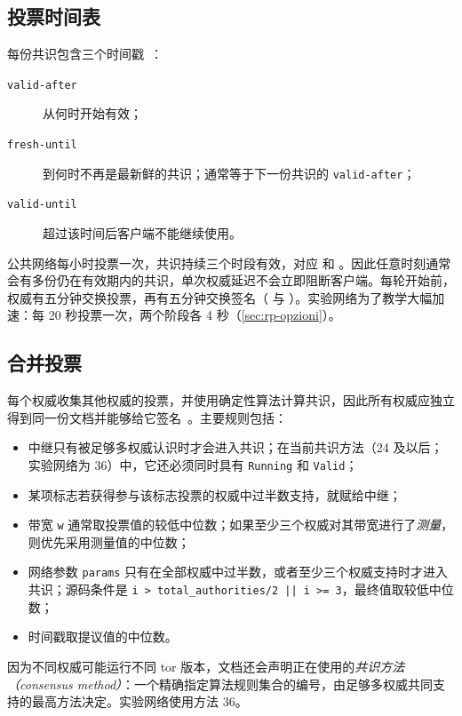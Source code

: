\subsection{投票时间表}

每份共识包含三个时间戳~：
\begin{description}
  \item[\texttt{valid-after}] 从何时开始有效；
  \item[\texttt{fresh-until}] 到何时不再是最新鲜的共识；通常等于下一份共识的 \texttt{valid-after}；
  \item[\texttt{valid-until}] 超过该时间后客户端不能继续使用。
\end{description}

公共网络每小时投票一次，共识持续三个时段有效，对应  和 。因此任意时刻通常会有多份仍在有效期内的共识，单次权威延迟不会立即阻断客户端。每轮开始前，权威有五分钟交换投票，再有五分钟交换签名（ 与 ）。实验网络为了教学大幅加速：每 20 秒投票一次，两个阶段各 4 秒（\cref{sec:rp-opzioni}）。

\subsection{合并投票}

每个权威收集其他权威的投票，并使用确定性算法计算共识，因此所有权威应独立得到同一份文档并能够给它签名~。主要规则包括：
\begin{itemize}
  \item 中继只有被足够多权威认识时才会进入共识；在当前共识方法（24 及以后；实验网络为 36）中，它还必须同时具有 \texttt{Running} 和 \texttt{Valid}；
  \item 某项标志若获得参与该标志投票的权威中过半数支持，就赋给中继；
  \item 带宽 \texttt{w} 通常取投票值的较低中位数；如果至少三个权威对其带宽进行了\emph{测量}，则优先采用测量值的中位数；
  \item 网络参数 \texttt{params} 只有在全部权威中过半数，或者至少三个权威支持时才进入共识；源码条件是 \texttt{i > total\_authorities/2 || i >= 3}，最终值取较低中位数；
  \item 时间戳取提议值的中位数。
\end{itemize}

因为不同权威可能运行不同 tor 版本，文档还会声明正在使用的\emph{共识方法（consensus method）}：一个精确指定算法规则集合的编号，由足够多权威共同支持的最高方法决定。实验网络使用方法 36。

